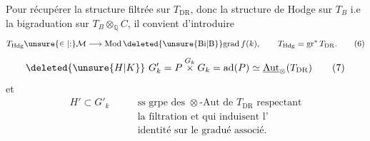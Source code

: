 Pour récupérer la structure filtrée sur $T_{\mathrm{DR}}$,  donc la structure de Hodge sur $T_B$ i.e la bigraduation sur $T_B\otimes_{\mathbb Q}C$, il convient d'introduire
\[
T_{\mathrm{Hdg}}\unsure{\in|\mathord{:}}\mathcal M\longrightarrow\operatorname{Mod}\deleted{\unsure{\mathrm{Bi}|\mathrm B}}\mathrm{grad}\,f(k),\qquad T_{\mathrm{Hdg}}=\operatorname{gr}^{*}T_{\mathrm{DR}}.\tag*{(6)}
\]
  
\[
\deleted{\unsure{H|K}}\ G'_k=P\overset{G_k}{\times}G_k=\operatorname{ad}(P)\simeq\underline{\operatorname{Aut}}_{\otimes}(T_{\mathrm{DR}})\tag*{(7)}
\]
 et
\[
\begin{aligned}
H'\subset G'_k\qquad &\text{ss grpe des $\otimes$-Aut de $T_{\mathrm{DR}}$ respectant}\\
&\text{la filtration et qui induisent l'}\\
&\text{identité sur le gradué associé.}
\end{aligned}\tag*{(8)}
\]
\endgroup
